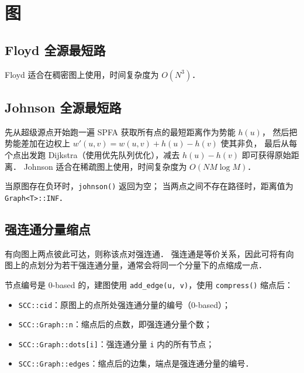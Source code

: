 \section{图}

\subsection{Floyd 全源最短路}

Floyd 适合在稠密图上使用，时间复杂度为 $O(N^3)$．



\subsection{Johnson 全源最短路}

先从超级源点开始跑一遍 SPFA 获取所有点的最短距离作为势能 $h(u)$，
然后把势能差加在边权上 $w'(u,v) = w(u,v) + h(u) - h(v)$ 使其非负，
最后从每个点出发跑 Dijkstra（使用优先队列优化），减去 $h(u) - h(v)$ 即可获得原始距离．
Johnson 适合在稀疏图上使用，时间复杂度为 $O(NM \log M)$．

当原图存在负环时，{\tt johnson()} 返回为空；
当两点之间不存在路径时，距离值为 {\tt Graph<T>::INF}．



\subsection{强连通分量缩点}

有向图上两点彼此可达，则称该点对强连通．
强连通是等价关系，因此可将有向图上的点划分为若干强连通分量，通常会将同一个分量下的点缩成一点．

节点编号是 0-based 的，建图使用 {\tt add\_edge(u, v)}，使用 {\tt compress()} 缩点后：

\begin{itemize}[noitemsep]
    \item {\tt SCC::cid}：原图上的点所处强连通分量的编号（0-based）；
    \item {\tt SCC::Graph::n}：缩点后的点数，即强连通分量个数；
    \item {\tt SCC::Graph::dots[i]}：强连通分量 {\tt i} 内的所有节点；
    \item {\tt SCC::Graph::edges}：缩点后的边集，端点是强连通分量的编号．
\end{itemize}

